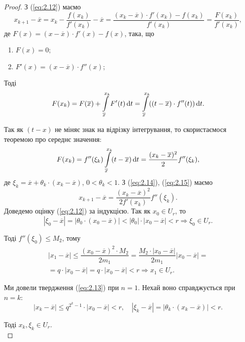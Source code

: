 \begin{proof}
	З (\ref{eq:2.12}) маємо 
	\begin{equation}
		\label{eq:2.14}
		x_{k+1} - \overline{x} = x_k - \dfrac{f(x_k)}{f'(x_k)} - \overline{x} = \dfrac{(x_k-\overline{x}) \cdot f'(x_k)-f(x_k)}{f'(x_k)} = \dfrac{F(x_k)}{f'(x_k)},
	\end{equation}
	де $F(x) = (x - \overline{x}) \cdot f'(x) - f (x)$, така, що
	\begin{enumerate}
		\item $F(x) = 0$;
		\item $F'(x) = (x - \overline{x}) \cdot f''(x)$;
	\end{enumerate}
	Тоді \[ F(x_k) = F(\overline{x}) + \displaystyle\int\limits_{\overline{x}}^{x_k}  F'(t) \mathop{}\!\mathrm{d} t = \displaystyle\int\limits_{\overline{x}}^{x_k}  ((t - \overline{x}) \cdot f''(t)) \mathop{}\!\mathrm{d} t . \]

	Так як $(t - x)$ не міняє знак на відрізку інтегрування, то скористаємося теоремою про середнє значення:
	\begin{equation}
		\label{eq:2.15}
		F(x_k) = f''(\xi_k) \displaystyle\int\limits_{\overline{x}}^{x_k}  (t - \overline{x}) \mathop{}\!\mathrm{d} t = \dfrac{(x_k-\overline{x})^2}{2} f''(\xi_k),
	\end{equation}
	де $\xi_k = \overline{x} + \theta_k \cdot (x_k - \overline{x})$, $0 <\theta_k < 1$. З (\ref{eq:2.14}), (\ref{eq:2.15}) маємо
	\begin{equation}
		\label{eq:2.16}
		x_{k+1} - \overline{x} = \dfrac{(x_k-\overline{x})^2}{2f'(x_k)} f''(\xi_k).
	\end{equation}
	Доведемо оцінку (\ref{eq:2.12}) за індукцією. Так як $x_0 \in U_r$, то \[|\xi_0 - \overline{x}| = |\theta_0 \cdot (x_0 - \overline{x})| < |\theta_0| \cdot |x_0 - \overline{x}| < r \Rightarrow \xi_0 \in U_r.\]

	Тоді $f''(\xi_0) \le M_2$, тому
	\begin{multline*} 
		|x_1 - \overline{x}| \le \dfrac{(x_0-\overline{x})^2 \cdot M_2}{2m_1} = \dfrac{M_2\cdot|x_0-\overline{x}|}{2m_1}|x_0-\overline{x}| = \\
		= q\cdot |x_0-\overline{x}|=q\cdot |x_0-\overline{x}|<r \Rightarrow x_1\in U_r.
	\end{multline*}

	Ми довели твердження (\ref{eq:2.13}) при $n = 1$. Нехай воно справджується при $n = k$:
	\[ |x_k - \overline{x}| \le q^{2^k-1}\cdot |x_0 - \overline{x}| < r, \quad |\xi_k - \overline{x}| = |\theta_k \cdot (x_k - \overline{x})| < r. \]

	Тоді $x_k, \xi_k \in U_r$. \\


\end{proof}

